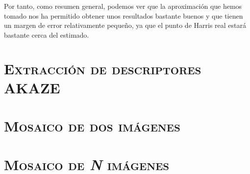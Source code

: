 \documentclass[11pt,a4paper]{article}
\begin{document}
Por tanto, como resumen general, podemos ver que la aproximación que
hemos tomado nos ha permitido obtener unos resultados bastante buenos
y que tienen un margen de error relativamente pequeño, ya que el punto de
Harris real estará bastante cerca del estimado.

\section{\textsc{Extracción de descriptores AKAZE}}

\section{\textsc{Mosaico de dos imágenes}}

\section{\textsc{Mosaico de \textit{N} imágenes}}

\newpage



\end{document}

